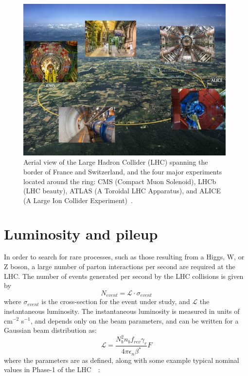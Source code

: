 \begin{figure}[ht]
    \centering
    \includegraphics[width=11cm]{figures/ch-2-cern-cms/aerial-view-LHC-ring.jpeg}
    \caption[Aerial view of the Large Hadron Collider (LHC).]{Aerial view of the Large Hadron Collider (LHC) spanning the border of France and Switzerland, and the four major experiments located around the ring: CMS (Compact Muon Solenoid), LHCb (LHC beauty), ATLAS (A Toroidal LHC Apparatus), and ALICE (A Large Ion Collider Experiment)~\cite{OPEN-PHO-ACCEL-2017-005}.}
    \label{fig:aerial-view-LHC-ring}
\end{figure}



\section{Luminosity and pileup}
\label{section:luminosity_and_pileup}
In order to search for rare processes, such as those resulting from a Higgs, W, or Z boson, a large number of parton interactions per second are required at the LHC. The number of events generated per second by the LHC collisions is given by
\begin{equation}
     N_{event} = \mathcal{L} \cdot \sigma_{event}
    \label{eqn:nEvents}
\end{equation} 
where $\sigma_{event}$ is the cross-section for the event under study, and $\mathcal{L}$ the instantaneous luminosity. The instantaneous luminosity is measured in units of cm$^{-2}$ s$^{-1}$, and depends only on the beam parameters, and can be written for a Gaussian beam distribution as:
\begin{equation}
    \mathcal{L} = \frac{N_b^2 n_b f_{rev} \gamma_r}{4\pi \epsilon_n \beta^*} F
\end{equation}
where the parameters are as defined, along with some example typical nominal values in Phase-1 of the LHC~\cite{CERN-luminosity-accelerator-school-article}~\cite{ipac2012-proceedings}:


